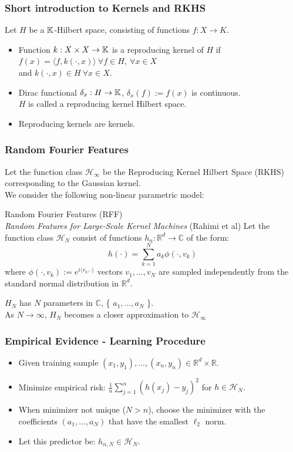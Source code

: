 \documentclass{beamer}
\newcommand\inner[1]{\langle#1\rangle}
\begin{document}
\begin{frame}
\frametitle{Short introduction to Kernels and RKHS}
Let $H$ be a $\mathbb{K}$-Hilbert space, consisting of functions $f: X \rightarrow K$.
\begin{itemize}
	\item Function $k:X \times X \rightarrow \mathbb{K}$ is a reproducing kernel of $H$ if $f(x) = \inner{f, k(\cdot, x)} ~ \forall f \in H, ~ \forall  x \in X $ 
	\\ and $k(\cdot, x) \in H ~ \forall x \in X$.
	\item Dirac functional $\delta_x: H \rightarrow \mathbb{K}$, $\delta_x(f) := f(x)$ is continuous.\\
	$H$ is called a reproducing kernel Hilbert space.
	\item Reproducing kernels are kernels.
\end{itemize} 

\end{frame}

\begin{frame}
\frametitle{Random Fourier Features}
Let the function class  $\mathcal{H}_\infty$ be the Reproducing Kernel Hilbert Space (RKHS) corresponding to the Gaussian kernel.\\
We consider the following non-linear parametric model:
\begin{block}{Random Fourier Features (RFF) \\ \small{\textit{Random Features for Large-Scale Kernel Machines} (Rahimi et al)}}
	Let the function class  $\mathcal{H}_N $ consist of functions $h_n : \mathbb{R}^d \to \mathbb{C}$ of the form:
	\[ h(\cdot) = \sum_{k=1}^{N} a_k\phi(\cdot, v_k) \] 
	where $\phi(\cdot , v_k) := e^{i
	\langle v_k , \cdot \rangle }$
	vectors $v_1, ... , v_N$ are sampled independently from the standard normal distribution in $\mathbb{R}^d$.
\end{block}
$H_N$ has $N$ parameters in $\mathbb{C}$, \{ $a_1, ..., a_N$ \}.\\
As $N \to \infty$, $H_N$ becomes a closer approximation to $\mathcal{H}_\infty$
\end{frame}

\begin{frame}
\frametitle{Empirical Evidence - Learning Procedure}
\begin{itemize}[itemsep = 12pt]
	\item Given training sample $(x_1, y_1), ..., (x_n, y_n) \in \mathbb{R}^d \times \mathbb{R}$.
	\item Minimize empirical risk: $\frac{1}{n}\sum_{j=1}^{n}(h(x_j)-y_j)^2$ for $h \in \mathcal{H}_N$.
	\item When minimizer not unique ($N > n$), choose the minimizer with the coefficients $(a_1, ..., a_N)$ that have the smallest $\ell_2$ norm.
	\item Let this predictor be: $h_{n,N} \in \mathcal{H}_N$.
\end{itemize}
\end{frame}
\end{document}
